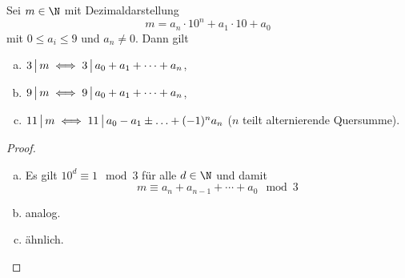 \begin{st}[Teilbarkeitskriterien] \label{1.16}
	Sei $m \in \N$ mit Dezimaldarstellung
	\[
		m = a_n \cdot 10^n + a_1 \cdot 10 + a_0
	\]
	mit $0 \le a_i \le 9$ und $a_n \neq 0$.
	Dann gilt
	\begin{enumerate}[a)]
		\item
			$3 \divs m \iff 3 \divs a_0 + a_1 + \dotsb + a_n$,
		\item
			$9 \divs m \iff 9 \divs a_0 + a_1 + \dotsb + a_n$,
		\item
			$11 \divs m \iff 11 \divs a_0 - a_1 \pm \dotsc + (-1)^n a_n$ ($n$ teilt alternierende Quersumme).
	\end{enumerate}
	\begin{proof}
		\begin{enumerate}[a)]
			\item
				Es gilt $10^d \equiv 1 \mod 3$ für alle $d \in \N$ und damit
				\[
					m \equiv a_n + a_{n-1} + \dotsb + a_0 \mod 3
				\]
			\item
				analog.
			\item
				ähnlich.
		\end{enumerate}
	\end{proof}
\end{st}
